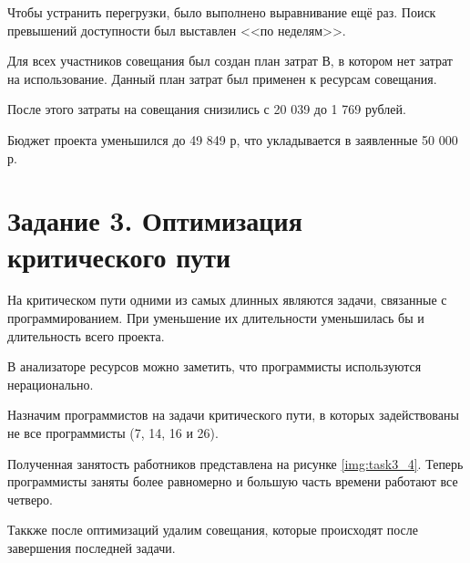 \documentclass{bmstu}
\begin{document}
Чтобы устранить перегрузки, было выполнено выравнивание ещё раз. Поиск превышений доступности был выставлен <<по неделям>>.


Для всех участников совещания был создан план затрат В, в котором нет затрат на использование. Данный план затрат был применен к ресурсам совещания.



\clearpage

После этого затраты на совещания снизились с 20 039 до 1 769 рублей.


Бюджет проекта уменьшился до 49 849 р, что укладывается в заявленные 50 000 р.


\clearpage

\section*{Задание 3. Оптимизация критического пути}

На критическом пути одними из самых длинных являются задачи, связанные с программированием. При уменьшение их длительности уменьшилась бы и длительность всего проекта.


В анализаторе ресурсов можно заметить, что программисты используются нерационально.


\clearpage

Назначим программистов на задачи критического пути, в которых задействованы не все программисты (7, 14, 16 и 26).


Полученная занятость работников представлена на рисунке \ref{img:task3_4}. Теперь программисты заняты более равномерно и большую часть времени работают все четверо.


\clearpage

Таккже после оптимизаций удалим совещания, которые происходят после завершения последней задачи.
\end{document}
